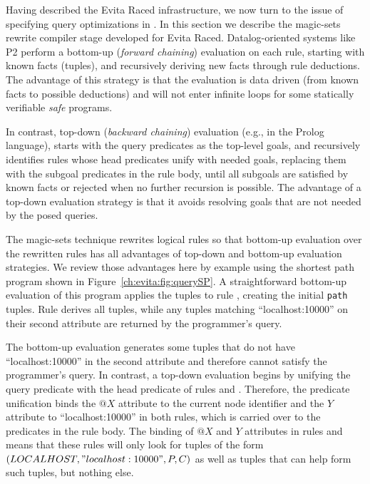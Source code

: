 Having described the Evita Raced infrastructure, we now turn to the issue of
specifying query optimizations in \OVERLOG.  In this section we describe the
magic-sets rewrite compiler stage developed for Evita Raced.  Datalog-oriented
systems like P2 perform a bottom-up (\emph{forward chaining}) evaluation on
each rule, starting with known facts (tuples), and recursively deriving new
facts through rule deductions.  The advantage of this strategy is that the
evaluation is data driven (from known facts to possible deductions) and will
not enter infinite loops for some statically verifiable \emph{safe} programs.

In contrast, top-down (\emph{backward chaining}) evaluation (e.g., in the
Prolog language), starts with the query predicates as the top-level goals, and
recursively identifies rules whose head predicates unify with needed goals,
replacing them with the subgoal predicates in the rule body, until all subgoals
are satisfied by known facts or rejected when no further recursion is possible.
The advantage of a top-down evaluation strategy is that it avoids resolving
goals that are not needed by the posed queries.

The magic-sets technique rewrites logical rules so that bottom-up evaluation
over the rewritten rules has all advantages of top-down and bottom-up
evaluation strategies.  We review those advantages here by example using the
shortest path program shown in Figure~\ref{ch:evita:fig:querySP}.  A
straightforward bottom-up evaluation of this program applies the 
tuples to rule , creating the initial {\tt path} tuples.  Rule 
derives all  tuples, while any  tuples matching
``localhost:10000'' on their second attribute are returned by the programmer's
query.

The bottom-up evaluation generates some  tuples that do not have
``localhost:10000'' in the second attribute and therefore cannot satisfy the
programmer's query.  In contrast, a top-down evaluation begins by unifying the
query predicate with the head predicate of rules  and .
Therefore, the  predicate unification binds the $@X$ attribute to the
current node identifier and the $Y$ attribute to ``localhost:10000'' in both
rules, which is carried over to the predicates in the rule body.  The binding
of $@X$ and $Y$ attributes in rules  and  means that these rules
will only look for tuples of the form
$(LOCALHOST,"localhost:10000",P,C)$ as well as tuples that can help
form such  tuples, but nothing else.


